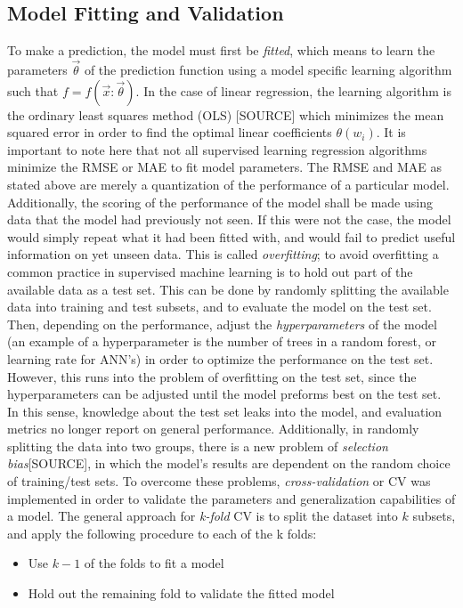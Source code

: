 \documentclass[a4paper, twoside, final, 12pt]{article}
\begin{document}
\subsection{Model Fitting and Validation}
To make a prediction, the model must first be \textit{fitted}, which means to learn the parameters $\vec{\theta}$ of the prediction function using a model specific learning algorithm such that $f = f(\vec{x}: \vec{\theta})$.
In the case of linear regression, the learning algorithm is the ordinary least squares method (OLS) [SOURCE] which minimizes the mean squared error in order to find the optimal linear coefficients $\theta(w_i)$.
It is important to note here that not all supervised learning regression algorithms minimize the RMSE or MAE to fit model parameters.
The RMSE and MAE as stated above are merely a quantization of the performance of a particular model.
Additionally, the scoring of the performance of the model shall be made using data that the model had previously not seen.
If this were not the case, the model would simply repeat what it had been fitted with, and would fail to predict useful information on yet unseen data.
This is called \textit{overfitting}; to avoid overfitting a common practice in supervised machine learning is to hold out part of the available data as a test set.
This can be done by randomly splitting the available data into training and test subsets, and to evaluate the model on the test set.
Then, depending on the performance, adjust the \textit{hyperparameters} of the model (an example of a hyperparameter is the number of trees in a random forest, or learning rate for ANN's) in order to optimize the performance on the test set.
However, this runs into the problem of overfitting on the test set, since the hyperparameters can be adjusted until the model preforms best on the test set.
In this sense, knowledge about the test set leaks into the model, and evaluation metrics no longer report on general performance.
Additionally, in randomly splitting the data into two groups, there is a new problem of \textit{selection bias}[SOURCE], in which the model's results are dependent on the random choice of training/test sets.
To overcome these problems, \textit{cross-validation} or CV was implemented in order to validate the parameters and generalization capabilities of a model.
The general approach for \textit{k-fold} CV is to split the dataset into $k$ subsets, and apply the following procedure to each of the k folds:
\begin{itemize}
	\item Use $k-1$ of the folds to fit a model 
	\item Hold out the remaining fold to validate the fitted model
\end{itemize}
\end{document}
